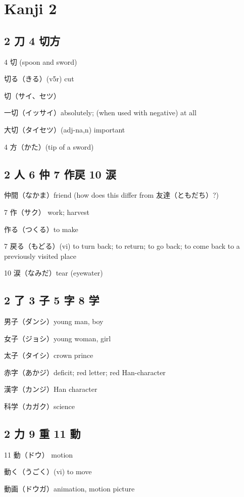 \chapter{Kanji 2}

\section{2 刀 4 切方}

4 切 (spoon and sword)

切る（きる）(v5r) cut

切（サイ、セツ）

一切（イッサイ）absolutely; (when used with negative) at all

大切（タイセツ）(adj-na,n) important

4 方（かた）(tip of a sword)

\section{2 人 6 仲 7 作戻 10 涙}

仲間（なかま）friend (how does this differ from 友達（ともだち）?)

7 作（サク） work; harvest

作る（つくる）to make

7 戻る（もどる）(vi) to turn back; to return; to go back;
to come back to a previously visited place

10 涙（なみだ）tear (eyewater)

\section{2 了 3 子 5 字 8 学}

男子（ダンシ）young man, boy

女子（ジョシ）young woman, girl

太子（タイシ）crown prince

赤字（あかジ）deficit; red letter; red Han-character

漢字（カンジ）Han character

科学（カガク）science

\section{2 力 9 重 11 動}

11 動（ドウ） motion

動く（うごく）(vi) to move

動画（ドウガ）animation, motion picture

